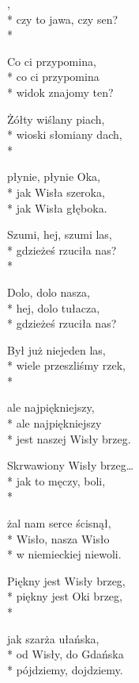 \begin{lyrics}[longestline={jest naszej Wisły brzeg.}]

,\\*
czy to jawa, czy sen?\\*
\begin{markverses}%
Co ci przypomina,\\*
co ci przypomina\\*
widok znajomy ten?
\end{markverses}

Żółty wiślany piach,\\*
wioski słomiany dach,\\*
\begin{markverses}%
płynie, płynie Oka,\\*
jak Wisła szeroka,\\*
jak Wisła głęboka.
\end{markverses}

Szumi, hej, szumi las,\\*
gdzieżeś rzuciła nas?\\*
\begin{markverses}%
Dolo, dolo nasza,\\*
hej, dolo tułacza,\\*
gdzieżeś rzuciła nas?
\end{markverses}

Był już niejeden las,\\*
wiele przeszliśmy rzek,\\*
\begin{markverses}%
ale najpiękniejszy,\\*
ale najpiękniejszy\\*
jest naszej Wisły brzeg.
\end{markverses}

Skrwawiony Wisły brzeg…\\*
jak to męczy, boli,\\*
\begin{markverses}%
żal nam serce ścisnął,\\*
Wisło, nasza Wisło\\*
w niemieckiej niewoli.
\end{markverses}

Piękny jest Wisły brzeg,\\*
piękny jest Oki brzeg,\\*
\begin{markverses}%
jak szarża ułańska,\\*
od Wisły, do Gdańska\\*
pójdziemy, dojdziemy.
\end{markverses}
\end{lyrics}
